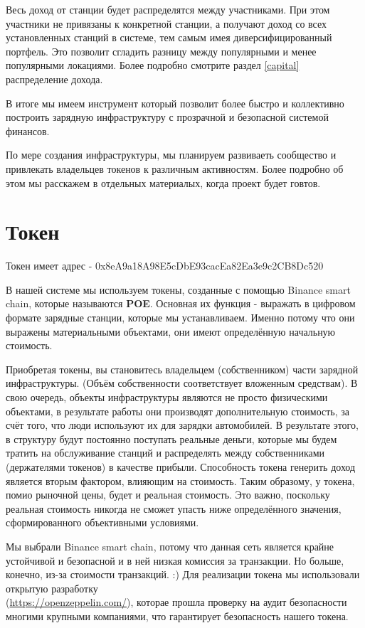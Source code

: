 \documentclass[a4paper,12pt]{report}
\newcommand{\contractAddress}{0x8eA9a18A98E5cDbE93cacEa82Ea3e9c2CB8Dc520}
\begin{document}
 
Весь доход от станции будет распределятся между участниками. При этом участники не привязаны к конкретной станции, а получают доход со всех установленных станций в системе, тем самым имея диверсифицированный портфель. Это позволит сгладить разницу между популярными и менее популярными локациями. 
Более подробно смотрите раздел \ref{capital} распределение дохода.

В итоге мы имеем инструмент который позволит более быстро и коллективно построить зарядную инфраструктуру с прозрачной и безопасной системой финансов.

По мере создания инфраструктуры, мы планируем развиваеть сообщество и привлекать владельцев токенов к различным активностям. Более подробно об этом мы расскажем в отдельных материалых, когда проект будет говтов.  

\section{Токен}

Токен имеет адрес - \contractAddress 

В нашей системе мы используем токены, созданные с помощью Binance smart chain, которые называются \textbf{POE}. Основная их функция - выражать в цифровом формате зарядные станции, которые мы устанавливаем. Именно потому что они выражены материальными объектами, они имеют определённую начальную стоимость.

Приобретая токены, вы становитесь владельцем (собственником) части зарядной инфраструктуры. (Объём собственности соответствует вложенным средствам). В свою очередь, объекты инфраструктуры являются не просто физическими объектами, в результате работы они производят дополнительную стоимость, за счёт того, что люди используют их для зарядки автомобилей. В результате этого, в структуру будут постоянно поступать реальные деньги, которые мы будем тратить на обслуживание станций и распределять между собственниками (держателями токенов) в качестве прибыли. Способность токена генерить доход является вторым фактором, влияющим на стоимость. Таким образому, у токена, помио рыночной цены, будет и реальная стоимость. Это важно, поскольку реальная стоимость никогда не сможет упасть ниже определённого значения, сформированного объективными условиями. 

Мы выбрали Binance smart chain, потому что данная сеть является крайне устойчивой и безопасной и в ней низкая комиссия за транзакции. Но больше, конечно, из-за стоимости транзакций. :)
Для реализации токена мы использовали открытую разработку \\ (\href{https://openzeppelin.com/}{https://openzeppelin.com/}), которае прошла проверку на аудит безопасности многими крупными компаниями, что гарантирует безопасность нашего токена.
\end{document}
